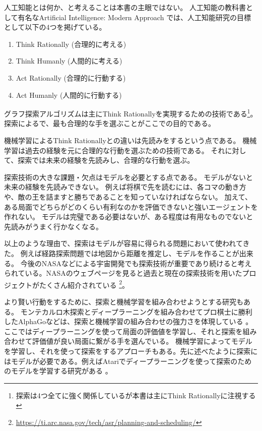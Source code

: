 人工知能とは何か、と考えることは本書の主眼ではない。
人工知能の教科書として有名なArtificial Intelligence: Modern Approach \cite{russelln03}では、人工知能研究の目標として以下の4つを掲げている。

\begin{mdframed}[backgroundcolor=gray!10, roundcorner=10pt]
\begin{enumerate}
\item Think Rationally (合理的に考える)
\item Think Humanly (人間的に考える)
\item Act Rationally (合理的に行動する)
\item Act Humanly (人間的に行動する)
\end{enumerate}
\end{mdframed}

グラフ探索アルゴリズムは主にThink Rationallyを実現するための技術である\footnote{探索は4つ全てに強く関係しているが本書は主にThink Rationallyに注視する}。
探索によるで、最も合理的な手を選ぶことがここでの目的である。

機械学習によるThink Rationallyとの違いは先読みをするという点である。
機械学習は過去の経験を元に合理的な行動を選ぶための技術である。
それに対して、探索では未来の経験を先読みし、合理的な行動を選ぶ。

探索技術の大きな課題・欠点はモデルを必要とする点である。
モデルがないと未来の経験を先読みできない。
例えば将棋で先を読むには、各コマの動き方や、敵の王を詰ますと勝ちであることを知っていなければならない。
加えて、ある局面でどちらがどのくらい有利なのかを評価できないと強いエージェントを作れない。 %
モデルは完璧である必要はないが、ある程度は有用なものでないと先読みがうまく行かなくなる。

以上のような理由で、探索はモデルが容易に得られる問題において使われてきた。
例えば経路探索問題では地図から距離を推定し、モデルを作ることが出来る。
今後のNASAなどによる宇宙開発でも探索技術が重要であり続けると考えられている。NASAのウェブページを見ると過去と現在の探索技術を用いたプロジェクトがたくさん紹介されている \footnote{\url{https://ti.arc.nasa.gov/tech/asr/planning-and-scheduling/}}。

より賢い行動をするために、探索と機械学習を組み合わせようとする研究もある。
モンテカルロ木探索とディープラーニングを組み合わせてプロ棋士に勝利したAlphaGoなどは、探索と機械学習の組み合わせの強力さを体現している \cite{silver2016mastering}。ここではディープラーニングを使って局面の評価値を学習し、それと探索を組み合わせて評価値が良い局面に繋がる手を選んでいる。
機械学習によってモデルを学習し、それを使って探索をするアプローチもある。先に述べたように探索にはモデルが必要である。例えばAtariでディープラーニングを使って探索のためのモデルを学習する研究がある \cite{oh2015action,silver2016predictron,chiappa2017recurrent}。

